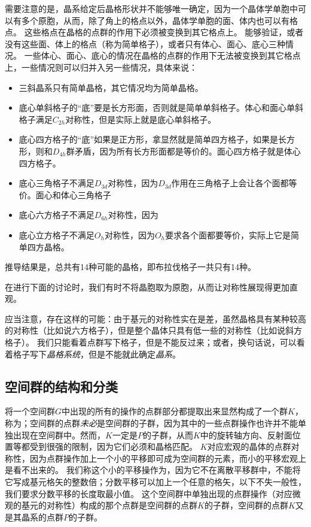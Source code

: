 需要注意的是，晶系给定后晶格形状并不能够唯一确定，因为一个晶体学单胞中可以有多个原胞，从而，除了角上的格点以外，晶体学单胞的面、体内也可以有格点。
这些格点在晶格的点群的作用下必须被变换到其它格点上。
能够验证，或者没有这些面、体上的格点（称为简单格子），或者只有体心、面心、底心三种情况。
一些体心、面心、底心的情况在晶格的点群的作用下无法被变换到其它格点上，一些情况则可以归并入另一些情况，具体来说：
\begin{itemize}
    \item 三斜晶系只有简单晶格，其它情况均为简单晶格。
    \item 底心单斜格子的“底”要是长方形面，否则就是简单单斜格子。体心和面心单斜格子满足$C_{2h}$对称性，但是实际上就是底心单斜格子。
    \item 底心四方格子的“底”如果是正方形，拿显然就是简单四方格子，如果是长方形，则和$D_{4h}$群矛盾，因为所有长方形面都是等价的。面心四方格子就是体心四方格子。
    \item 底心三角格子不满足$D_{3d}$对称性，因为$D_{3d}$作用在三角格子上会让各个面都等价。面心和体心三角格子%
    \item 底心六方格子不满足$D_{6h}$对称性，因为%
    \item 底心立方格子不满足$O_h$对称性，因为$O_h$要求各个面都要等价，实际上它是简单四方晶格。
\end{itemize}
推导结果是，总共有14种可能的晶格，即布拉伐格子一共只有14种。

在进行下面的讨论时，我们有时不将晶胞取为原胞，从而让对称性展现得更加直观。

应当注意，存在这样的可能：由于基元的对称性实在是差，虽然晶格具有某种较高的对称性（比如说六方格子），但是整个晶体只具有低一些的对称性（比如说斜方格子）。
我们只能看着点群写下格子，但是不能反过来；或者，换句话说，可以看着格子写下\emph{晶格系统}，但是不能就此确定\emph{晶系}。

\subsection{空间群的结构和分类}

将一个空间群$G$中出现的所有的操作的点群部分都提取出来显然构成了一个群$K$，称为；空间群的点群\emph{未必}是空间群的子群，因为其中的一些点群操作也许并不能单独出现在空间群中。然而，$K$一定是$P$的子群，从而$K$中的旋转轴方向、反射面位置等都受到很强的限制，因为它们必须和晶格匹配。
$K$对应宏观的晶体的点群对称性，因为点群操作加上一个小的平移即可成为空间群的元素，而小的平移宏观上是看不出来的。
我们称这个小的平移操作为，因为它不在离散平移群中，不能将它写成基元格矢的整数倍；分数平移可以加上一个任意的格矢，以下不失一般性，我们要求分数平移的长度取最小值。
这个空间群中单独出现的点群操作（对应微观的基元的对称性）构成的那个点群是空间群的点群$K$的子群，空间群的点群$K$又是其晶系的点群$P$的子群。


